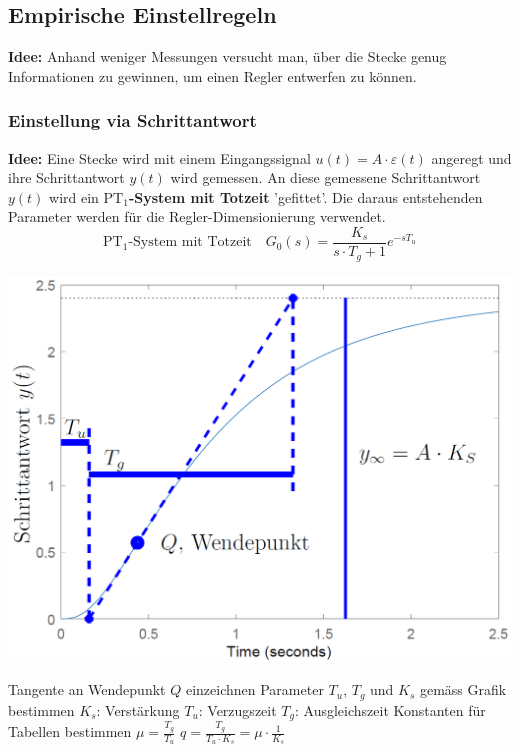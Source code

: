 \subsection{Empirische Einstellregeln}

\textbf{Idee:} Anhand weniger Messungen versucht man, über die Stecke genug Informationen zu gewinnen, um einen Regler entwerfen
zu können.


\subsubsection{Einstellung via Schrittantwort}

\textbf{Idee:} Eine Stecke wird mit einem Eingangssignal $u(t) = A \cdot \varepsilon(t)$ angeregt und ihre 
Schrittantwort $y(t)$ wird gemessen. An diese gemessene Schrittantwort $y(t)$ wird ein \textbf{$\text{PT}_1$-System mit Totzeit}
'gefittet'. Die daraus entstehenden Parameter werden für die Regler-Dimensionierung verwendet.
$$ \text{PT}_1 \text{-System mit Totzeit} \quad G_0(s) = \frac{K_s}{s \cdot T_g + 1} e^{- s T_u} $$

\begin{minipage}[c]{0.45\columnwidth}
    \includegraphics[width=\columnwidth]{images/pid_regler_empirisch_einstellen.png}
\end{minipage}
\hfill
\begin{minipage}[c]{0.52\columnwidth}
    \begin{center}
        \textbf{}
    \end{center}

    \begin{outline}
        \1 Tangente an Wendepunkt $Q$ einzeichnen
        \1 Parameter $T_u$, $T_g$ und $K_s$ gemäss Grafik bestimmen
            \2 $K_s$: Verstärkung
            \2 $T_u$: Verzugszeit
            \2 $T_g$: Ausgleichszeit
        \1 Konstanten für Tabellen bestimmen
            \2 $\mu = \frac{T_g}{T_u}$
            \2 $q = \frac{T_g}{T_u \cdot K_s} = \mu \cdot \frac{1}{K_s}$
    \end{outline}
\end{minipage}

